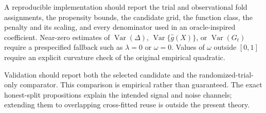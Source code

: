 A reproducible implementation should report the trial and observational fold assignments, the propensity bounds, the candidate grid, the function class, the penalty and its scaling, and every denominator used in an oracle-inspired coefficient. Near-zero estimates of $\operatorname{Var}(\Delta)$, $\operatorname{Var}\{\widehat{g}(X)\}$, or $\operatorname{Var}(G_t)$ require a prespecified fallback such as $\lambda=0$ or $\omega=0$. Values of $\omega$ outside $[0,1]$ require an explicit curvature check of the original empirical quadratic.

Validation should report both the selected candidate and the randomized-trial-only comparator. This comparison is empirical rather than guaranteed. The exact honest-split propositions explain the intended signal and noise channels; extending them to overlapping cross-fitted reuse is outside the present theory.

